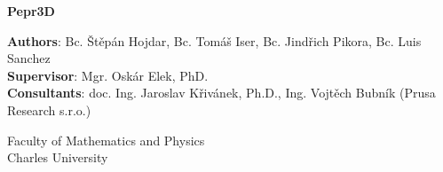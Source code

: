 \documentclass[12pt,a4paper]{report}
\begin{document}
\begin{titlepage}
    \begin{center}
        \vspace*{1cm}
        
        \Huge
        \textbf{Pepr3D}

        \LARGE
        
        \vspace{12cm}
        
		\Large
        \textbf{Authors}: Bc. Štěpán Hojdar,
                Bc. Tomáš Iser,       
        Bc. Jindřich Pikora,
		Bc. Luis Sanchez
		\\
		\textbf{Supervisor}: Mgr. Oskár Elek, PhD.
		\\
		\textbf{Consultants}: doc. Ing. Jaroslav Křivánek, Ph.D., Ing. Vojtěch Bubník (Prusa Research s.r.o.)
        
        \vfill

		Faculty of Mathematics and Physics \\	
		Charles University		               
    \end{center}
\end{titlepage}

\tableofcontents




% 
% 
% 
% 
% 



\end{document}
